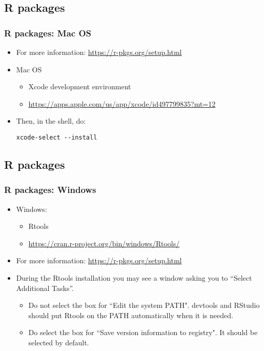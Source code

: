 \documentclass[11pt]{beamer}
\begin{document}
\subsection{R packages}
\begin{frame}[fragile]
\frametitle{{\sf R} packages: Mac OS}
\begin{itemize}
\item For more information: \url{https://r-pkgs.org/setup.html}
\vspace{0.2in}
\item Mac OS
\begin{itemize}
\item Xcode development environment
\item \url{https://apps.apple.com/us/app/xcode/id497799835?mt=12}
\end{itemize} 
\vspace{0.2in}
\item Then, in the shell, do:
\begin{itemize}
\begin{verbatim}
xcode-select --install
\end{verbatim}
\end{itemize} 
\end{itemize}
\end{frame}


\subsection{R packages}
\begin{frame}
\frametitle{{\sf R} packages: Windows}
\begin{itemize}
\item Windows:
\begin{itemize}
\item Rtools 
\item \url{https://cran.r-project.org/bin/windows/Rtools/}
\vspace{0.2in}
\end{itemize} 
\item For more information: \url{https://r-pkgs.org/setup.html}
\vspace{0.2in}
\item During the Rtools installation you may see a window asking you to “Select Additional Tasks”.
\vspace{0.1in}
\begin{itemize}
\item Do not select the box for ``Edit the system PATH". devtools and RStudio should put Rtools on the PATH automatically when it is needed.
\item Do select the box for ``Save version information to registry". It should be selected by default.
\end{itemize}
\end{itemize}
\end{frame}
\end{document}
